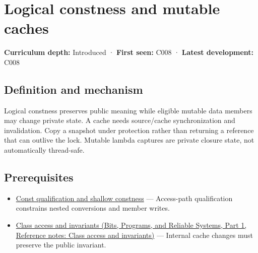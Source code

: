 \hypertarget{appendix-f5593256bcaf}{}\label{referencestart:appendix-f5593256bcaf}
\section{Logical constness and mutable caches}\label{appendix-f5593256bcaf-logical-constness-and-mutable-caches}

\hypertarget{appendix-f5593256bcaf-logical-constness-and-mutable-caches}{}

\textbf{Curriculum depth:} Introduced · \textbf{First seen:} C008 · \textbf{Latest development:} C008

\begin{allmightroledefinition}

\subsection{Definition and mechanism}\label{appendix-f5593256bcaf-definition-and-mechanism}

\hypertarget{appendix-f5593256bcaf-definition-and-mechanism}{}

Logical constness preserves public meaning while eligible mutable data members may change private state. A cache needs source/cache synchronization and invalidation. Copy a snapshot under protection rather than returning a reference that can outlive the lock. Mutable lambda captures are private closure state, not automatically thread-safe.

\end{allmightroledefinition}

\subsection{Prerequisites}\label{appendix-f5593256bcaf-prerequisites}

\hypertarget{appendix-f5593256bcaf-prerequisites}{}

\begin{itemize}
\tightlist
\item
  \hyperref[appendix-c25d60fed375]{Const qualification and shallow constness} --- Access-path qualification constrains nested conversions and member writes.
\item
  \href{../01-Bits-Programs-and-Reliable-Systems-P01/main.pdf\#appendix-8e5214819615}{Class access and invariants (Bits, Programs, and Reliable Systems, Part 1, Reference notes: Class access and invariants)} --- Internal cache changes must preserve the public invariant.
\end{itemize}

